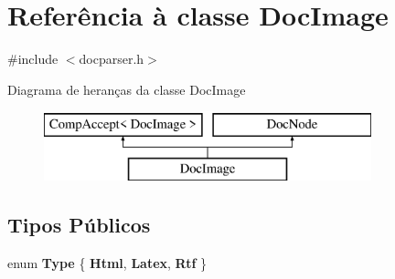 \hypertarget{class_doc_image}{\section{Referência à classe Doc\-Image}
\label{class_doc_image}
}


{\ttfamily \#include $<$docparser.\-h$>$}

Diagrama de heranças da classe Doc\-Image\begin{figure}[H]
\begin{center}
\leavevmode
\includegraphics[height=2.000000cm]{class_doc_image}
\end{center}
\end{figure}
\subsection*{Tipos Públicos}
\begin{DoxyCompactItemize}
\item 
enum {\bfseries Type} \{ {\bfseries Html}, 
{\bfseries Latex}, 
{\bfseries Rtf}
 \}
\end{DoxyCompactItemize}
